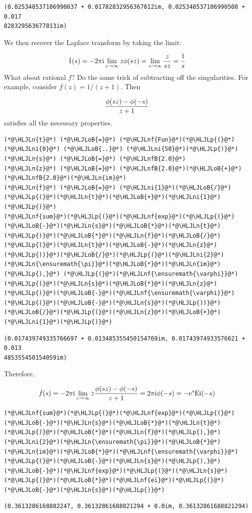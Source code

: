 \documentclass[12pt,a4paper]{article}
\newcommand{\HLJLn}[1]{#1}
\newcommand{\HLJLnf}[1]{\textcolor[RGB]{66,102,213}{#1}}
\newcommand{\HLJLnfB}[1]{\textcolor[RGB]{59,151,46}{#1}}
\newcommand{\HLJLni}[1]{\textcolor[RGB]{59,151,46}{#1}}
\newcommand{\HLJLoB}[1]{\textcolor[RGB]{102,102,102}{\textbf{#1}}}
\newcommand{\HLJLp}[1]{#1}
\def\I{ {\rm i} }
\def\E{ {\rm e} }
\begin{document}
\begin{lstlisting}
(0.025348537106990837 + 0.01782832956367812im, 0.025348537106990508 + 0.017
828329563677813im)
\end{lstlisting}


We then recover the Laplace transform by taking the limit:

\[
\check 1(s) = -2 \pi \I  \lim_{z\rightarrow \infty} z \phi(s z) = 
\lim_{z\rightarrow \infty} {z \over s z} = {1 \over s}
\]
What about rational $f$? Do the same trick of subtracting off the singularities.  For example, consider $f(z) = 1/(z+1)$. Then

\[
{\phi(s z) - \phi(-s) \over z+1}
\]
satisfies all the necessary properties.


\begin{lstlisting}
(*@\HLJLn{t}@*) (*@\HLJLoB{=}@*) (*@\HLJLnf{Fun}@*)(*@\HLJLp{(}@*)(*@\HLJLni{0}@*) (*@\HLJLoB{..}@*) (*@\HLJLni{50}@*)(*@\HLJLp{)}@*)
(*@\HLJLn{s}@*) (*@\HLJLoB{=}@*) (*@\HLJLnfB{2.0}@*)
(*@\HLJLn{z}@*) (*@\HLJLoB{=}@*) (*@\HLJLnfB{2.0}@*)(*@\HLJLoB{+}@*)(*@\HLJLnfB{2.0}@*)(*@\HLJLn{im}@*)
(*@\HLJLn{f}@*) (*@\HLJLoB{=}@*) (*@\HLJLni{1}@*)(*@\HLJLoB{/}@*)(*@\HLJLp{(}@*)(*@\HLJLn{t}@*)(*@\HLJLoB{+}@*)(*@\HLJLni{1}@*)(*@\HLJLp{)}@*)
(*@\HLJLnf{sum}@*)(*@\HLJLp{(}@*)(*@\HLJLnf{exp}@*)(*@\HLJLp{(}@*)(*@\HLJLoB{-}@*)(*@\HLJLn{s}@*)(*@\HLJLoB{*}@*)(*@\HLJLn{t}@*)(*@\HLJLp{)}@*)(*@\HLJLoB{*}@*)(*@\HLJLn{f}@*)(*@\HLJLoB{/}@*)(*@\HLJLp{(}@*)(*@\HLJLn{t}@*)(*@\HLJLoB{-}@*)(*@\HLJLn{z}@*)(*@\HLJLp{))}@*)(*@\HLJLoB{/}@*)(*@\HLJLp{(}@*)(*@\HLJLni{2}@*)(*@\HLJLn{\ensuremath{\pi}}@*)(*@\HLJLoB{*}@*)(*@\HLJLn{im}@*)(*@\HLJLp{),}@*) (*@\HLJLp{(}@*)(*@\HLJLnf{\ensuremath{\varphi}}@*)(*@\HLJLp{(}@*)(*@\HLJLn{s}@*)(*@\HLJLoB{*}@*)(*@\HLJLn{z}@*)(*@\HLJLp{)}@*)(*@\HLJLoB{-}@*)(*@\HLJLnf{\ensuremath{\varphi}}@*)(*@\HLJLp{(}@*)(*@\HLJLoB{-}@*)(*@\HLJLn{s}@*)(*@\HLJLp{))}@*)(*@\HLJLoB{/}@*)(*@\HLJLp{(}@*)(*@\HLJLn{z}@*)(*@\HLJLoB{+}@*)(*@\HLJLni{1}@*)(*@\HLJLp{)}@*)
\end{lstlisting}

\begin{lstlisting}
(0.017439749335766697 + 0.013485355450154769im, 0.01743974933576621 + 0.013
485355450154059im)
\end{lstlisting}


Therefore, 

\[
\check f(s) = -2 \pi \I  \lim_{z\rightarrow \infty} z {\phi(s z) - \phi(-s) \over z+1}  = 
2 \pi \I \phi(-s) = -\E^{s} {\rm Ei}(-s)
\]

\begin{lstlisting}
(*@\HLJLnf{sum}@*)(*@\HLJLp{(}@*)(*@\HLJLnf{exp}@*)(*@\HLJLp{(}@*)(*@\HLJLoB{-}@*)(*@\HLJLn{s}@*)(*@\HLJLoB{*}@*)(*@\HLJLn{t}@*)(*@\HLJLp{)}@*)(*@\HLJLoB{*}@*)(*@\HLJLn{f}@*)(*@\HLJLp{),}@*) (*@\HLJLni{2}@*)(*@\HLJLn{\ensuremath{\pi}}@*)(*@\HLJLoB{*}@*)(*@\HLJLn{im}@*)(*@\HLJLoB{*}@*)(*@\HLJLnf{\ensuremath{\varphi}}@*)(*@\HLJLp{(}@*)(*@\HLJLoB{-}@*)(*@\HLJLn{s}@*)(*@\HLJLp{),}@*) (*@\HLJLoB{-}@*)(*@\HLJLnf{exp}@*)(*@\HLJLp{(}@*)(*@\HLJLn{s}@*)(*@\HLJLp{)}@*)(*@\HLJLoB{*}@*)(*@\HLJLnf{ei}@*)(*@\HLJLp{(}@*)(*@\HLJLoB{-}@*)(*@\HLJLn{s}@*)(*@\HLJLp{)}@*)
\end{lstlisting}

\begin{lstlisting}
(0.3613286168882247, 0.36132861688821294 + 0.0im, 0.36132861688821294)
\end{lstlisting}
\end{document}
